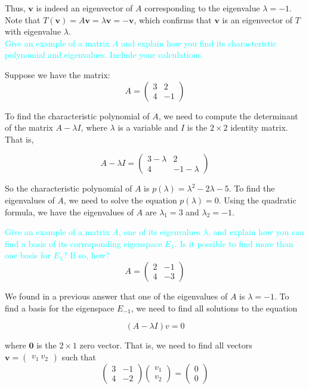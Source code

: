 \documentclass[fontsize=12pt]{scrartcl}
\begin{document}
\noindent
Thus, $\mathbf{v}$ is indeed an eigenvector of $A$ corresponding to the eigenvalue $\lambda = -1$. Note that $T(\mathbf{v}) = A\mathbf{v} = \lambda \mathbf{v} = -\mathbf{v}$, which confirms that $\mathbf{v}$ is an eigenvector of $T$ with eigenvalue $\lambda$.
\\

\noindent
\textcolor{cyan}{Give an example of a matrix $A$ and explain how you find its characteristic polynomial and eigenvalues. Include your calculations.}

\noindent
Suppose we have the matrix:
$$A = \left(\begin{array}{cc} 3 & 2 \\ 4 & -1 \end{array} \right) $$

\noindent
To find the characteristic polynomial of $A$, we need to compute the determinant of the matrix $A-\lambda I$, where $\lambda$ is a variable and $I$ is the $2\times 2$ identity matrix. That is,

$$A - \lambda I = \left(\begin{array}{cc} 3-\lambda & 2 \\ 4 & -1-\lambda \end{array} \right) $$

\noindent
So the characteristic polynomial of $A$ is $p(\lambda) = \lambda^2 - 2\lambda - 5$. To find the eigenvalues of $A$, we need to solve the equation $p(\lambda) = 0$. Using the quadratic formula, we have the eigenvalues of $A$ are $\lambda_1 = 3$ and $\lambda_2 = -1$.


\newpage


\noindent
\textcolor{cyan}{Give an example of a matrix $A$, one of its eigenvalues $\lambda$, and explain how you can find a basis of its corresponding eigenspace $E_{\lambda}$. Is it possible to find more than one basis for $E_{\lambda}$? If so, how?}\\
$$A = \left(\begin{array}{cc} 2 & -1 \\ 4 & -3 \end{array} \right) $$

\noindent
We found in a previous answer that one of the eigenvalues of $A$ is $\lambda=-1$. To find a basis for the eigenspace $E_{-1}$, we need to find all solutions to the equation

$$(A - \lambda I)v = 0 $$

\noindent
where $\mathbf{0}$ is the $2 \times 1$ zero vector. That is, we need to find all vectors $\mathbf{v} = \begin{pmatrix} v_1 \ v_2 \end{pmatrix}$ such that
$$\left(\begin{array}{cc} 3 & -1 \\ 4 & -2 \end{array} \right)\left(\begin{array}{cc} v_1 \\ v_2 \end{array} \right) = \left(\begin{array}{cc} 0 \\ 0 \end{array} \right)$$
\end{document}
